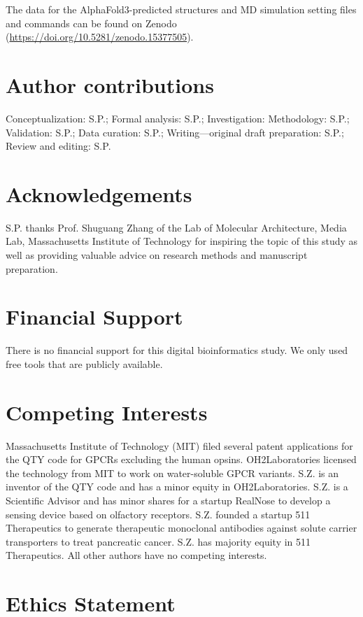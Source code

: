 \documentclass[fleqn, 10pt]{manuscript}
\begin{document}
The data for the AlphaFold3-predicted structures and MD simulation setting files and commands can be found on Zenodo (\url{https://doi.org/10.5281/zenodo.15377505}). 

\section*{Author contributions}

Conceptualization: S.P.; Formal analysis: S.P.; Investigation: Methodology: S.P.; Validation: S.P.; Data curation: S.P.; Writing—original draft preparation: S.P.; Review and editing: S.P. 

\section*{Acknowledgements}

S.P. thanks Prof. Shuguang Zhang of the Lab of Molecular Architecture, Media Lab, Massachusetts Institute of Technology for inspiring the topic of this study as well as providing valuable advice on research methods and manuscript preparation. 

\section*{Financial Support}

There is no financial support for this digital bioinformatics study. We only used free tools that are publicly available. 

\section*{Competing Interests}

Massachusetts Institute of Technology (MIT) filed several patent applications for the QTY code for GPCRs excluding the human opsins. OH2Laboratories licensed the technology from MIT to work on water-soluble GPCR variants. S.Z. is an inventor of the QTY code and has a minor equity in OH2Laboratories. S.Z. is a Scientific Advisor and has minor shares for a startup RealNose to develop a sensing device based on olfactory receptors. S.Z. founded a startup 511 Therapeutics to generate therapeutic monoclonal antibodies against solute carrier transporters to treat pancreatic cancer. S.Z. has majority equity in 511 Therapeutics. All other authors have no competing interests.


\section*{Ethics Statement}
\end{document}

